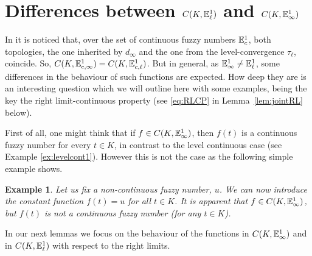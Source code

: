 \documentclass{amsart}
\newtheorem{example}[theorem]{Example}
\newcommand{\fn}{\mathbb{E}\sp{1}}
\begin{document}
\section{Differences between $C(K, \fn_{\ell})$ and $C(K, \fn_{\infty})$}
\label{sec:diff}

In \cite{FoMiSan} it is noticed that, over the set of continuous fuzzy numbers $\fn_{c}$, both topologies, the one inherited by $d_{\infty}$ and  the one from the level-convergence $\tau_{\ell}$, coincide. So, $C(K,\fn_{c,\infty})=C(K,\fn_{c,\ell})$.
But in general, as $\fn_{\infty}\neq \fn_{\ell}$,  some differences in the behaviour of such functions are expected. How deep they are is an interesting question which we will outline here with some examples, being the key the right limit-continuous property (see \eqref{eq:RLCP} in Lemma~\ref{lem:jointRL} below).

First of all, one might think that if $f\in C(K, \fn_{\infty})$, then $f(t)$ is a continuous fuzzy number for every $t\in K$, in contrast to the level continuous case (see Example  \ref{ex:levelcont1}). However this is not the case as the following simple example shows.



\begin{example}
Let us fix a non-continuous fuzzy number, $u$.
We can now introduce the constant function $f(t)=u$ for all $t\in K$. It is apparent that $f\in C(K, \fn_{\infty})$, but $f(t)$ is not a continuous fuzzy number (for any $t\in K$).


\end{example}

In our next lemmas we focus on the behaviour of the functions in $C(K, \fn_{\infty})$ and in $C(K, \fn_{\ell})$ with respect to the right limits.
\end{document}
